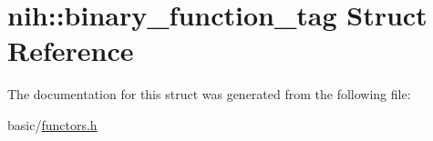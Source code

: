 \hypertarget{structnih_1_1binary__function__tag}{
\section{nih\-:\-:binary\-\_\-function\-\_\-tag \-Struct \-Reference}
\label{structnih_1_1binary__function__tag}
}


\-The documentation for this struct was generated from the following file\-:\begin{DoxyCompactItemize}
\item 
basic/\hyperlink{functors_8h}{functors.\-h}\end{DoxyCompactItemize}

